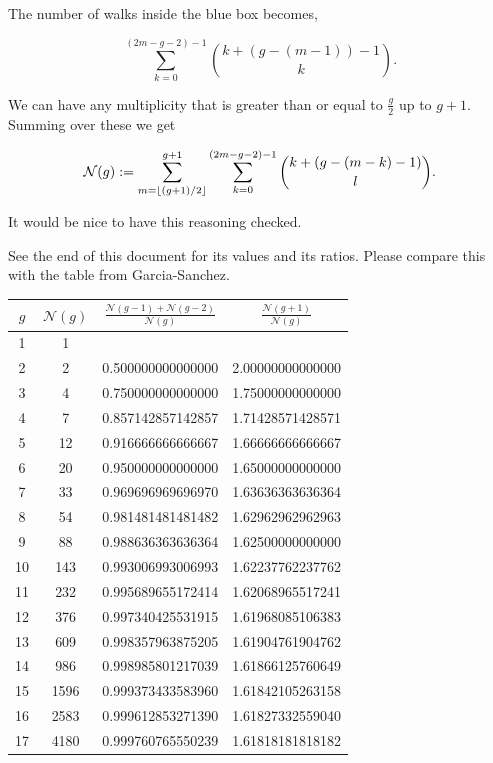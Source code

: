 The number of walks inside the blue box becomes,

\[\sum\limits_{k = 0}^{(2m-g-2)-1} {k + (g- (m - 1)) - 1 \choose k}.\]

We can have any multiplicity that is greater than or equal to \(\frac{g}{2}\) up to \(g+1\). Summing over these we get

\[\mathcal{N}(g) := \sum\limits_{m = \left\lfloor (g+1)/2 \right\rfloor}^{g+1} \sum\limits_{k = 0}^{(2m-g-2)-1} {k + (g- (m - k) - 1) \choose l}.\]

It would be nice to have this reasoning checked.

See the end of this document for its values and its ratios. Please compare this with the table from Garcia-Sanchez.

\newpage
\begin{table}[!h]
\centering
\begin{tabular}{|c|c|c|c|}
\hline
$g$ & $\mathcal{N}(g)$ & $\frac{\mathcal{N}(g-1) + \mathcal{N}(g-2)}{\mathcal{N}(g)}$ & $\frac{\mathcal{N}(g+1)}{\mathcal{N}(g)}$ \\
\hline
1 & 1 & &\\
2 & 2 & 0.500000000000000 & 2.00000000000000 \\
3 & 4 & 0.750000000000000 & 1.75000000000000 \\
4 & 7 & 0.857142857142857 & 1.71428571428571 \\
5 & 12 & 0.916666666666667 & 1.66666666666667 \\
6 & 20 & 0.950000000000000 & 1.65000000000000 \\
7 & 33 & 0.969696969696970 & 1.63636363636364 \\
8 & 54 & 0.981481481481482 & 1.62962962962963 \\
9 & 88 & 0.988636363636364 & 1.62500000000000 \\
10 & 143 & 0.993006993006993 & 1.62237762237762 \\
11 & 232 & 0.995689655172414 & 1.62068965517241 \\
12 & 376 & 0.997340425531915 & 1.61968085106383 \\
13 & 609 & 0.998357963875205 & 1.61904761904762 \\
14 & 986 & 0.998985801217039 & 1.61866125760649 \\
15 & 1596 & 0.999373433583960 & 1.61842105263158 \\
16 & 2583 & 0.999612853271390 & 1.61827332559040 \\
17 & 4180 & 0.999760765550239 & 1.61818181818182 \\

\end{tabular}
\end{table}
